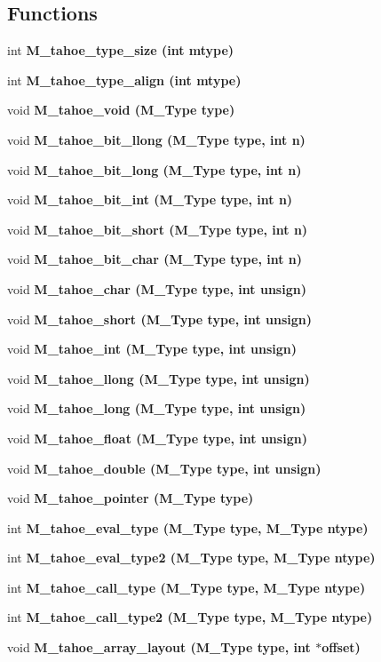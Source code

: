 \subsection*{Functions}
\begin{CompactItemize}
\item 
int \bf{M\_\-tahoe\_\-type\_\-size} (int mtype)
\item 
int \bf{M\_\-tahoe\_\-type\_\-align} (int mtype)
\item 
void \bf{M\_\-tahoe\_\-void} (\bf{M\_\-Type} type)
\item 
void \bf{M\_\-tahoe\_\-bit\_\-llong} (\bf{M\_\-Type} type, int n)
\item 
void \bf{M\_\-tahoe\_\-bit\_\-long} (\bf{M\_\-Type} type, int n)
\item 
void \bf{M\_\-tahoe\_\-bit\_\-int} (\bf{M\_\-Type} type, int n)
\item 
void \bf{M\_\-tahoe\_\-bit\_\-short} (\bf{M\_\-Type} type, int n)
\item 
void \bf{M\_\-tahoe\_\-bit\_\-char} (\bf{M\_\-Type} type, int n)
\item 
void \bf{M\_\-tahoe\_\-char} (\bf{M\_\-Type} type, int unsign)
\item 
void \bf{M\_\-tahoe\_\-short} (\bf{M\_\-Type} type, int unsign)
\item 
void \bf{M\_\-tahoe\_\-int} (\bf{M\_\-Type} type, int unsign)
\item 
void \bf{M\_\-tahoe\_\-llong} (\bf{M\_\-Type} type, int unsign)
\item 
void \bf{M\_\-tahoe\_\-long} (\bf{M\_\-Type} type, int unsign)
\item 
void \bf{M\_\-tahoe\_\-float} (\bf{M\_\-Type} type, int unsign)
\item 
void \bf{M\_\-tahoe\_\-double} (\bf{M\_\-Type} type, int unsign)
\item 
void \bf{M\_\-tahoe\_\-pointer} (\bf{M\_\-Type} type)
\item 
int \bf{M\_\-tahoe\_\-eval\_\-type} (\bf{M\_\-Type} type, \bf{M\_\-Type} ntype)
\item 
int \bf{M\_\-tahoe\_\-eval\_\-type2} (\bf{M\_\-Type} type, \bf{M\_\-Type} ntype)
\item 
int \bf{M\_\-tahoe\_\-call\_\-type} (\bf{M\_\-Type} type, \bf{M\_\-Type} ntype)
\item 
int \bf{M\_\-tahoe\_\-call\_\-type2} (\bf{M\_\-Type} type, \bf{M\_\-Type} ntype)
\item 
void \bf{M\_\-tahoe\_\-array\_\-layout} (\bf{M\_\-Type} type, int $\ast$offset)

\end{CompactItemize}
